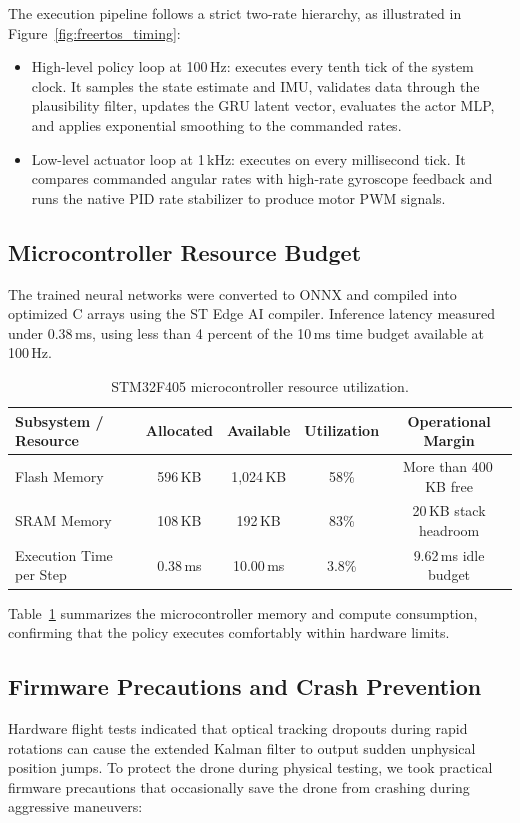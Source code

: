 \documentclass[11pt,a4paper]{article}
\begin{document}
The execution pipeline follows a strict two-rate hierarchy, as illustrated in Figure~\ref{fig:freertos_timing}:
\begin{itemize}[leftmargin=*,itemsep=2pt]
  \item High-level policy loop at 100\,Hz: executes every tenth tick of the system clock. It samples the state estimate and IMU, validates data through the plausibility filter, updates the GRU latent vector, evaluates the actor MLP, and applies exponential smoothing to the commanded rates.
  \item Low-level actuator loop at 1\,kHz: executes on every millisecond tick. It compares commanded angular rates with high-rate gyroscope feedback and runs the native PID rate stabilizer to produce motor PWM signals.
\end{itemize}

\subsection{Microcontroller Resource Budget}
The trained neural networks were converted to ONNX and compiled into optimized C arrays using the ST Edge AI compiler. Inference latency measured under 0.38\,ms, using less than 4 percent of the 10\,ms time budget available at 100\,Hz.

\begin{table}[h!]
  \centering
  \small
  \caption{STM32F405 microcontroller resource utilization.}
  \label{tab:mcu_budget}
  \begin{tabularx}{\textwidth}{Xcccc}
    \toprule
    Subsystem / Resource & Allocated & Available & Utilization & Operational Margin \\
    \midrule
    Flash Memory & 596\,KB & 1,024\,KB & 58\% & More than 400\,KB free \\
    SRAM Memory & 108\,KB & 192\,KB & 83\% & 20\,KB stack headroom \\
    Execution Time per Step & 0.38\,ms & 10.00\,ms & 3.8\% & 9.62\,ms idle budget \\
    \bottomrule
  \end{tabularx}
\end{table}

Table~\ref{tab:mcu_budget} summarizes the microcontroller memory and compute consumption, confirming that the policy executes comfortably within hardware limits.

\subsection{Firmware Precautions and Crash Prevention}
Hardware flight tests indicated that optical tracking dropouts during rapid rotations can cause the extended Kalman filter to output sudden unphysical position jumps. To protect the drone during physical testing, we took practical firmware precautions that occasionally save the drone from crashing during aggressive maneuvers:
\end{document}
